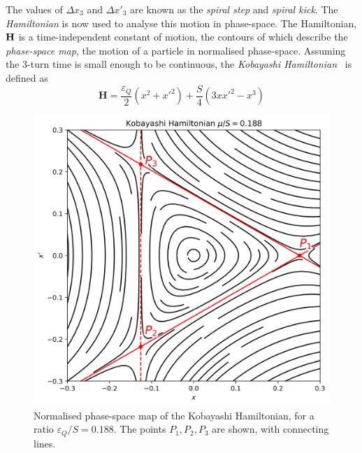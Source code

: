 \documentclass[11pt]{report}
\begin{document}
The values of $\Delta x_3$ and $\Delta x'_3$ are known as the \textit{spiral step} and \textit{spiral kick}.
The \textit{Hamiltonian} is now used to analyse this motion in phase-space. The Hamiltonian, $\bf H$ is a time-independent constant of motion, the contours of which describe the \textit{phase-space map}, the motion of a particle in normalised phase-space. Assuming the 3-turn time is small enough to be continuous, the \textit{Kobayashi Hamiltonian}~\cite{kobayashi} is defined as
\begin{equation}
  \textbf{H} =\frac{\varepsilon_Q} 2(x^2+x'^2)+\frac S4(3xx'^2-x^3)
\end{equation}

\begin{figure}
  \centering
  \includegraphics[width=0.6\linewidth]{kobayashi.png}
  \caption{Normalised phase-space map of the Kobayashi Hamiltonian, for a ratio ${\varepsilon_Q}/S=0.188$. The points $P_1, P_2, P_3$ are shown, with connecting lines.}\label{fig:kobayashi}
\end{figure}
\end{document}
